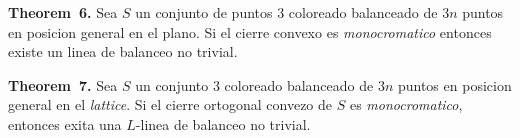 \documentclass[xcolor=table]{beamer}
\begin{document}
\begin{mdframe}%

\begin{mdbmarginx}{1ex}{0pt}{1ex}{0pt}%
\noindent{}\textbf{Theorem~6.} \mdbr
{}  Sea $S$ un conjunto de puntos 3 coloreado balanceado de $3n$ puntos en posicion general
  en el plano. Si el cierre convexo es \emph{monocromatico} entonces existe un linea de balanceo
  no trivial.%
\end{mdbmarginx}%
\end{mdframe}%

\begin{mdframe}%

\begin{mdbmarginx}{1ex}{0pt}{1ex}{0pt}%
\noindent{}\textbf{Theorem~7.} \mdbr
{}Sea $S$ un conjunto 3 coloreado balanceado de $3n$ puntos en posicion general en el \emph{lattice}.
Si el cierre ortogonal convezo de $S$ es \emph{monocromatico}, entonces exita una $L$-linea de balanceo
no trivial.%
\end{mdbmarginx}%
\end{mdframe}%
\end{document}
